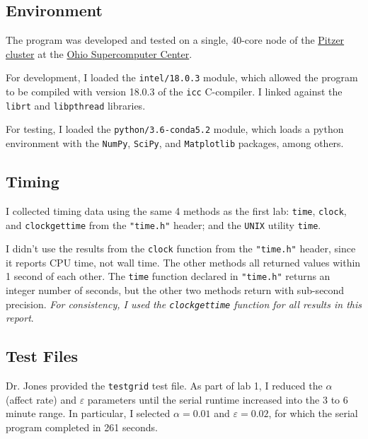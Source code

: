 \documentclass{article}
\begin{document}
\subsection*{Environment}
\label{subsec:environment}

The program was developed and tested on a single, 40-core node of the
\href{https://www.osc.edu/resources/technical_support/supercomputers/pitzer}{Pitzer
cluster} at the \href{https://www.osc.edu/}{Ohio Supercomputer Center}.

For development, I loaded the \texttt{intel/18.0.3} module, which allowed the
program to be compiled with version 18.0.3 of the \texttt{icc} C-compiler. I
linked against the \texttt{librt} and \texttt{libpthread} libraries.

For testing, I loaded the \texttt{python/3.6-conda5.2} module, which loads a
python environment with the \texttt{NumPy}, \texttt{SciPy}, and
\texttt{Matplotlib} packages, among others.

\subsection*{Timing}
\label{subsec:timing}

I collected timing data using the same 4 methods as the first lab:
\texttt{time}, \texttt{clock}, and \texttt{clock\textunderscore gettime} from
the \texttt{"time.h"} header; and the \texttt{UNIX} utility \texttt{time}.

I didn't use the results from the \texttt{clock} function from the
\texttt{"time.h"} header, since it reports CPU time, not wall time. The other
methods all returned values within 1 second of each other. The \texttt{time}
function declared in \texttt{"time.h"} returns an integer number of seconds,
but the other two methods return with sub-second precision.  \emph{For
consistency, I used the \texttt{clock\textunderscore gettime} function for all
results in this report}.

\subsection*{Test Files}
\label{subsec:test_files}

Dr. Jones provided the \texttt{testgrid} test file.  As part of lab 1, I reduced the $\alpha$ (affect rate) and
$\varepsilon$ parameters until the serial runtime increased into the 3 to 6
minute range. In particular, I selected $\alpha = 0.01$ and $\varepsilon =
0.02$, for which the serial program completed in 261 seconds.
\end{document}
